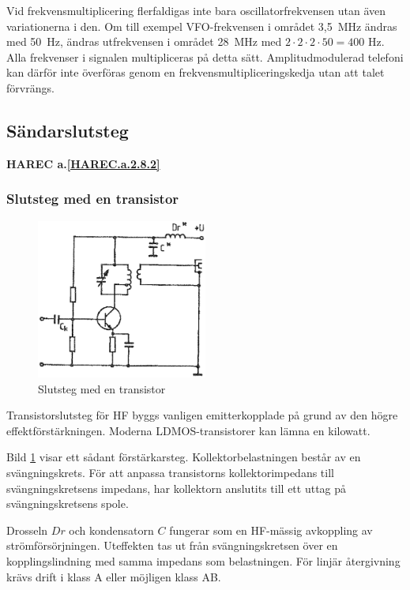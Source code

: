 Vid frekvensmultiplicering flerfaldigas inte bara oscillatorfrekvensen utan
även variationerna i den.
Om till exempel VFO-frekvensen i området 3,5~MHz ändras med 50~Hz, ändras
utfrekvensen i området 28~MHz med \(2 \cdot 2 \cdot 2 \cdot 50 = 400\) Hz.
Alla frekvenser i signalen multipliceras på detta sätt.
Amplitudmodulerad telefoni kan därför inte överföras genom en
frekvensmultipliceringskedja utan att talet förvrängs.

\subsection{Sändarslutsteg}
\textbf{HAREC a.\ref{HAREC.a.2.8.2}\label{myHAREC.a.2.8.2}}

\subsubsection{Slutsteg med en transistor}

\begin{figure}
\includegraphics[width=0.5\textwidth]{images/cropped_pdfs/bild_2_3-48.pdf}
\caption{Slutsteg med en transistor}
\label{fig:BildII3-48}
\end{figure}

Transistorslutsteg för HF byggs vanligen emitterkopplade på grund av den
högre effektförstärkningen.
Moderna LDMOS-transistorer kan lämna en kilowatt.

Bild \ref{fig:BildII3-48} visar ett sådant förstärkarsteg.
Kollektorbelastningen består av en svängningskrets.
För att anpassa transistorns kollektorimpedans till svängningskretsens
impedans, har kollektorn anslutits till ett uttag på svängningskretsens spole.

Drosseln \(Dr\) och kondensatorn \(C\) fungerar som en HF-mässig avkoppling av
strömförsörjningen.
Uteffekten tas ut från svängningskretsen över en kopplingslindning med samma
impedans som belastningen.
För linjär återgivning krävs drift i klass A eller möjligen klass AB.

